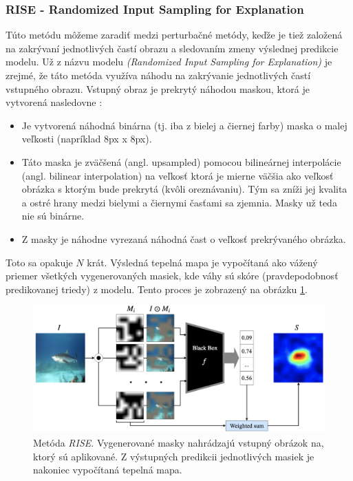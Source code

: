 
\subsubsection{RISE - Randomized Input Sampling for Explanation \label{sec:rise}}

Túto metódu môžeme zaradiť medzi perturbačné metódy, keďže je tiež založená na zakrývaní jednotlivých častí obrazu a sledovaním zmeny výslednej predikcie modelu. Už z názvu modelu \textit{(Randomized Input Sampling for Explanation)} je zrejmé, že táto metóda využíva náhodu na zakrývanie jednotlivých častí vstupného obrazu. Vstupný obraz je prekrytý náhodou maskou, ktorá je vytvorená nasledovne \cite{petsiuk2018rise}:

\begin{itemize}
    \item Je vytvorená náhodná binárna (tj. iba z bielej a čiernej farby) maska o malej veľkosti (napríklad 8px x 8px).
    \item Táto maska je zväčšená (angl. upsampled) pomocou bilineárnej interpolácie \cite{petsiuk2018rise} (angl. bilinear interpolation) na veľkosť ktorá je mierne väčšia ako veľkosť obrázka s ktorým bude prekrytá (kvôli oreznávaniu). Tým sa zníži jej kvalita a ostré hrany medzi bielymi a čiernymi časťami sa zjemnia. Masky už teda nie sú binárne.
    \item Z masky je náhodne vyrezaná náhodná čast o veľkosť prekrývaného obrázka.
\end{itemize}


Toto sa opakuje $N$ krát. Výsledná tepelná mapa je vypočítaná ako vážený priemer všetkých vygenerovaných masiek, kde váhy sú skóre (pravdepodobnosť predikovanej triedy) z modelu. Tento proces je zobrazený na obrázku \ref{fig:rise_architecture}.

\begin{figure}[h!]
    \centering
    \includegraphics[scale=0.35]{assets/images/rise_architecture.png}
    \caption{Metóda \textit{RISE}. \cite{petsiuk2018rise} Vygenerované masky nahrádzajú vstupný obrázok na, ktorý sú aplikované. Z výstupných predikcii jednotlivých masiek je nakoniec vypočítaná tepelná mapa.}
    \label{fig:rise_architecture}
\end{figure}

